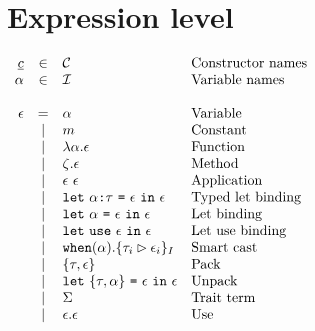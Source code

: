 \documentclass{article}[11pt]
\newcommand{\term}[1]{\verb~#1~}
\begin{document}
    \section{Expression level}\label{sec:expression-level}

    \begin{math}
        \begin{array}{rclp{5cm}}
            \underline{c} & \in  & {\cal C}                                                                     & Constructor names \\
            \alpha        & \in  & {\cal I}                                                                     & Variable names    \\
            \\
            \epsilon & =
            & \alpha                                                                         & Variable              \\
            & \mid & m                                                                       & Constant              \\
            & \mid & \lambda \alpha . \epsilon                                               & Function              \\
            & \mid & \zeta . \epsilon                                                          & Method              \\
            & \mid & \epsilon ~ \epsilon                                                     & Application              \\
            & \mid & \term{let}~\alpha \term{:} \tau ~ \term{=} ~ \epsilon ~ \term{in} ~ \epsilon & Typed~let~binding              \\
            & \mid & \term{let}~\alpha ~ \term{=} ~ \epsilon ~ \term{in} ~ \epsilon          & Let~binding              \\
            & \mid & \term{let}~\term{use} ~ \epsilon ~\term{in}~\epsilon                    & Let~use~binding              \\
            & \mid & \term{when}(\alpha).\{ \tau_i \rhd \epsilon_i \}_I                      & Smart cast              \\
            & \mid & \{\tau, \epsilon\}                                                      & Pack              \\
            & \mid & \term{let} ~ \{\tau, \alpha\} ~ \term{=} ~ \epsilon ~\term{in}~\epsilon & Unpack              \\
            & \mid & \Sigma                                                                  & Trait~term              \\
            & \mid & \epsilon . \epsilon                                                     & Use              \\
        \end{array} \\
    \end{math}
\end{document}
